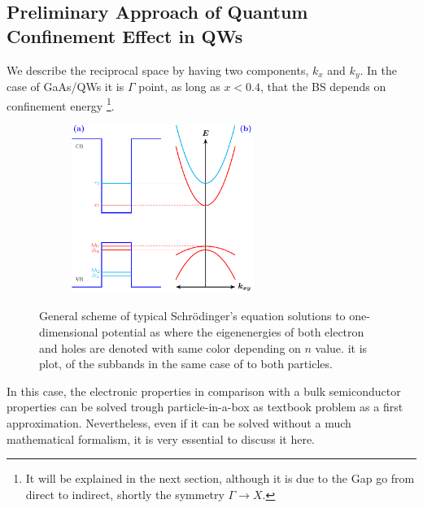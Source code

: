 \subsection{Preliminary Approach of Quantum Confinement Effect in QWs}
\label{subsection:chapter-1-preliminary-approach-of-quantum-confinment-effect-in-qws}
\vspace{-10mm} 
We describe the reciprocal space by having two components, $k_{x}$ and $k_{y}$. In the case of GaAs/\algaas \gls{QW}s it is $\Gamma$ point, as long as $x < 0.4$, that the \gls{BS} depends on confinement energy \footnote{It will be explained in the next section, although it is due to the Gap go from direct to indirect, shortly the symmetry $\Gamma\to X$.}.
\begin{figure}[t]
	\begin{subfigure}{\textwidth}
		\centering
		\includegraphics[width=0.65\textwidth]{../figures/chapter-1/heterostructures/out/qw2}
		\label{subfig:subsection-1.2-single-quantum-well-scheme2-a)}
		\label{subfig:subsection-1.2-single-quantum-well-scheme2-b)}
	\end{subfigure}
	\caption{General scheme of typical Schrödinger's equation solutions to one-dimensional potential as  where the eigenenergies of both electron and holes are denoted with same color depending on  $n$ value. it is plot, of the subbands in  the same case of   to both particles.  }
	\label{fig:subsection-1.2-single-quantum-well-scheme2}
\end{figure}
In this case, the electronic properties in comparison with a bulk semiconductor properties can be solved trough particle-in-a-box as textbook problem as a first approximation. Nevertheless, even if it can be solved  without  a much mathematical formalism, it is very essential to discuss it here. 
